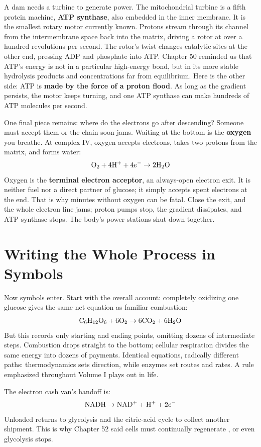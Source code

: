A dam needs a turbine to generate power. The mitochondrial turbine is a fifth protein machine, \textbf{ATP synthase}, also embedded in the inner membrane. It is the smallest rotary motor currently known. Protons stream through its channel from the intermembrane space back into the matrix, driving a rotor at over a hundred revolutions per second. The rotor's twist changes catalytic sites at the other end, pressing ADP and phosphate into ATP. Chapter 50 reminded us that ATP's energy is not in a particular high-energy bond, but in its more stable hydrolysis products and concentrations far from equilibrium. Here is the other side: ATP is \textbf{made by the force of a proton flood}. As long as the gradient persists, the motor keeps turning, and one ATP synthase can make hundreds of ATP molecules per second.

One final piece remains: where do the electrons go after descending? Someone must accept them or the chain soon jams. Waiting at the bottom is the \textbf{oxygen} you breathe. At complex IV, oxygen accepts electrons, takes two protons from the matrix, and forms water:
\[\mathrm{O_2} + 4\mathrm{H^+} + 4e^- \rightarrow 2\mathrm{H_2O}\]
Oxygen is the \textbf{terminal electron acceptor}, an always-open electron exit. It is neither fuel nor a direct partner of glucose; it simply accepts spent electrons at the end. That is why minutes without oxygen can be fatal. Close the exit, and the whole electron line jams; proton pumps stop, the gradient dissipates, and ATP synthase stops. The body's power stations shut down together.

\section{Writing the Whole Process in Symbols}

Now symbols enter. Start with the overall account: completely oxidizing one glucose gives the same net equation as familiar combustion:
\[\mathrm{C_6H_{12}O_6} + 6\mathrm{O_2} \rightarrow 6\mathrm{CO_2} + 6\mathrm{H_2O}\]
But this records only starting and ending points, omitting dozens of intermediate steps. Combustion drops straight to the bottom; cellular respiration divides the same energy into dozens of payments. Identical equations, radically different paths: thermodynamics sets direction, while enzymes set routes and rates. A rule emphasized throughout Volume I plays out in life.

The electron cash van's handoff is:
\[\mathrm{NADH} \rightarrow \mathrm{NAD^+} + \mathrm{H^+} + 2e^-\]
Unloaded  returns to glycolysis and the citric-acid cycle to collect another shipment. This is why Chapter 52 said cells must continually regenerate , or even glycolysis stops.

